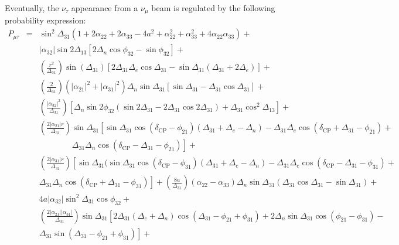\documentclass[11pt,a4paper]{article}
\begin{document}
\begin{appendix}
Eventually, the $\nu_{\tau}$ appearance from a $\nu_{\mu}$ beam is regulated by the following probability expression:
\begin{eqnarray}
P_{\mu \tau} &=& \sin^2\Delta_{31}\left(1+2 \alpha_{22}+2 \alpha_{33}-4 a^2+ \alpha_{22}^2+ \alpha_{33}^2 + 4 \alpha_{22} \alpha_{33}\right)  +\nonumber \\
&&|\alpha_{32}| \sin2\Delta_{13} \left[2 \Delta_n   \cos \phi _{32}-\sin\phi_{32}\right] +\nonumber \\
&& \left(\frac{r^2}{\Delta_{31}}\right) \sin (\Delta_{31}) \left[2 \Delta_{31} \Delta_e\cos\Delta_{31}-\sin\Delta_{31} (\Delta_{31}+2 \Delta_e )\right] + \nonumber \\
&& \left(\frac{2 }{\Delta_{31}}\right)\left(|\alpha_{21}|^2+|\alpha_{31}|^2\right)\Delta_{n} \sin\Delta_{31} \left[\sin\Delta_{31}-\Delta_{31} \cos\Delta_{31}\right] + \nonumber \\
&&\left(\frac{|\alpha_{32}|^2}{\Delta_{31}}\right) \left[\Delta_n  \sin2 \phi_{32} (\sin2 \Delta_{31}-2 \Delta_{31} \cos2 \Delta_{31})+\Delta_{31} \cos ^2\Delta_{13}\right] +  \nonumber \\
&&\left(\frac{2 |\alpha_{21}| r} {\Delta_{31}}\right)\sin \Delta_{31} \left[\sin\Delta_{31} \cos (\delta_{\mathrm{CP}}-\phi_{21}) (\Delta_{31}+\Delta_e -\Delta_n )-\Delta_{31} \Delta_e   \cos (\delta_{\mathrm{CP}}+\Delta_{31}-\phi_{21})+\right.\nonumber \\
&& \qquad \qquad \left. \Delta_{31} \Delta_n \cos (\delta_{\mathrm{CP}}-\Delta_{31}-\phi _{21})\right] + \nonumber \\
&&\left(\frac{2 |\alpha_{31}| r}{\Delta_{31}}\right) \left[\sin \Delta_{31}(\sin\Delta_{31} \cos(\delta_{\mathrm{CP}}-\phi_{31}) (\Delta_{31}+\Delta_e -\Delta_n )-\Delta_{31} \Delta_e  \cos (\delta_{\mathrm{CP}}-\Delta_{31}-\phi_{31})+ \right.\nonumber \\ &&  \left. \Delta_{31} \Delta_n   \cos (\delta_{\mathrm{CP}}+\Delta_{31}-\phi_{31})\right] + \left(\frac{8 a}{\Delta_{31}}\right)\left(\alpha_{22}-\alpha_{33}\right) \Delta_n \sin\Delta_{31} (\Delta_{31} \cos\Delta_{31}-\sin \Delta_{31}) + \nonumber  \\
&& 4 a |\alpha_{32}| \sin^2\Delta_{31} \cos\phi_{32} +\nonumber \\
&& \left(\frac{2 |\alpha_{21}| |\alpha_{31}|}{\Delta_{31}}\right) \sin\Delta_{31} \left[2 \Delta_{31} (\Delta_e+\Delta_n) \cos (\Delta_{31}-\phi_{21}+\phi_{31})+2 \Delta_n 
\sin\Delta_{31} \cos (\phi_{21}-\phi_{31})-\right.\nonumber \\
&&  \left.\Delta_{31} \sin (\Delta_{31}-\phi_{21}+\phi_{31})\right] + \nonumber \\ 

\end{eqnarray}
\end{appendix}
\end{document}
